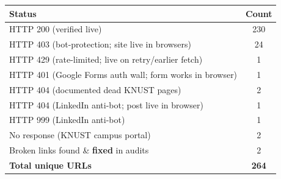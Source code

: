 \documentclass[11pt,a4paper]{article}
\begin{document}
\begin{center}
\begin{tabular}{@{}lc@{}}
\toprule
\textbf{Status} & \textbf{Count} \\
\midrule
HTTP 200 (verified live) & 230 \\
HTTP 403 (bot-protection; site live in browsers) & 24 \\
HTTP 429 (rate-limited; live on retry/earlier fetch) & 1 \\
HTTP 401 (Google Forms auth wall; form works in browser) & 1 \\
HTTP 404 (documented dead KNUST pages) & 2 \\
HTTP 404 (LinkedIn anti-bot; post live in browser) & 1 \\
HTTP 999 (LinkedIn anti-bot) & 1 \\
No response (KNUST campus portal) & 2 \\
Broken links found \& \textbf{fixed} in audits & 2 \\
\midrule
\textbf{Total unique URLs} & \textbf{264} \\
\bottomrule
\end{tabular}
\end{center}
\end{document}

